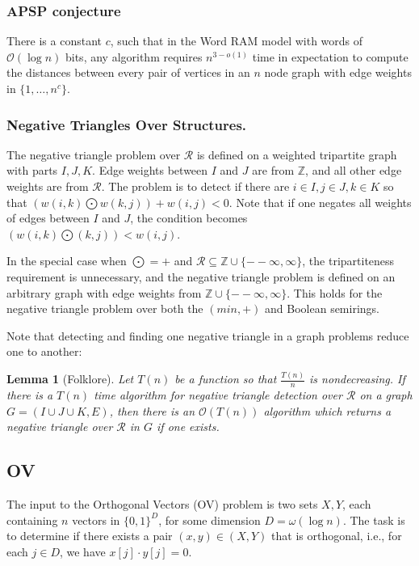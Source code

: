 \documentclass{amsart}
\newtheorem*{lemma}{Lemma}
\begin{document}
	\subsubsection{APSP conjecture}
	There is a constant $c$, such that in the Word RAM model with words of $\mathcal{O}(\log n)$ bits, any algorithm requires $n^{3 - o(1)}$ time in expectation to compute the distances between every pair of vertices in an $n$ node graph with edge weights in $\{1, \ldots, n^c\}$.
	
	\subsubsection{Negative Triangles Over Structures.}
	
	The negative triangle problem over $\mathcal{R}$ is defined on a weighted tripartite graph with parts $I, J, K$. Edge weights between $I$ and $J$ are from $\mathbb{Z}$, and all other edge weights are from
	$\mathcal{R}$. The problem is to detect if there are $i \in I, j \in J, k \in K$ so that $(w(i, k) \bigodot w(k, j)) + w(i, j) < 0$. Note that if one negates all weights of edges between $I$ and $J$, the condition becomes $(w(i, k) \bigodot(k, j)) < w(i, j)$.
	
	In the special case when $\bigodot = +$ and $\mathcal{R} \subseteq \mathbb{Z} \cup \{ -- \infty, \infty\}$, the tripartiteness requirement is unnecessary, and the negative triangle problem is defined on an arbitrary graph with edge weights from $\mathbb{Z} \cup \{ -- \infty, \infty\}$. This
	holds for the negative triangle problem over both the $(min, +)$ and Boolean semirings.
	
	Note that detecting and finding one negative triangle in a graph problems reduce one to another:
	
	\begin{lemma}[Folklore]
		Let $T(n)$ be a function so that $\frac{T(n)}{n}$ is nondecreasing. If there is a $T(n)$ time
		algorithm for negative triangle detection over $\mathcal{R}$ on a graph $G = (I \cup J \cup K, E)$, then there is an $\mathcal{O}(T(n))$ algorithm which returns a negative triangle over $\mathcal{R}$ in $G$ if one exists.
	\end{lemma}

	\subsection{OV}
	
	The input to the Orthogonal Vectors (OV) problem is two sets $X, Y$, each containing $n$ vectors in $\{0, 1\}^D$, for some dimension $D = \omega(\log n)$. The task is to determine if there exists a pair $(x, y) \in (X, Y)$ that is orthogonal, i.e., for each $j \in D$, we have $x[j] \cdot y[j] = 0$. 
	
\end{document}
